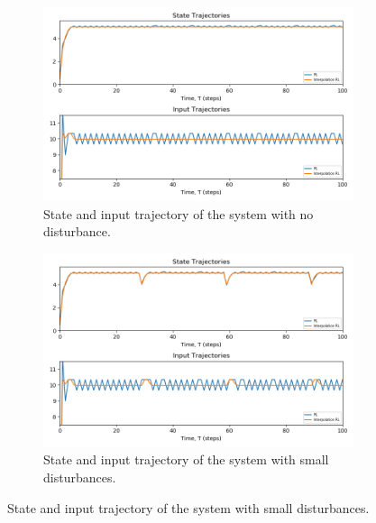 \begin{figure}[H]
     \centering
     \begin{subfigure}{0.49\textwidth}
         \centering
         \includegraphics[width=\textwidth]{images/ch4/no_dist.png}
         \caption{State and input trajectory of the system with no disturbance.}
         \label{fig:04no_dist}
     \end{subfigure}
     \hfill
     \begin{subfigure}{0.49\textwidth}
         \centering
         \includegraphics[width=\textwidth]{images/ch4/small_dist.png}
         \caption{State and input trajectory of the system with small disturbances.}
         \label{fig:04low_dist}
     \end{subfigure}
\end{figure}



